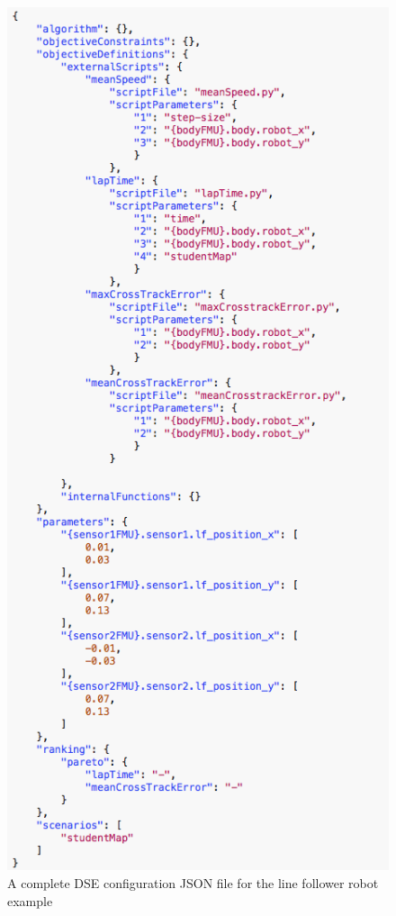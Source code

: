 \begin{figure}[h]
	\centering
	\includegraphics[scale=0.45]{figures/config-whole}
		\caption{A complete DSE configuration JSON file for the line follower robot example}
		\label{fig:dse_config_json}
\end{figure}

